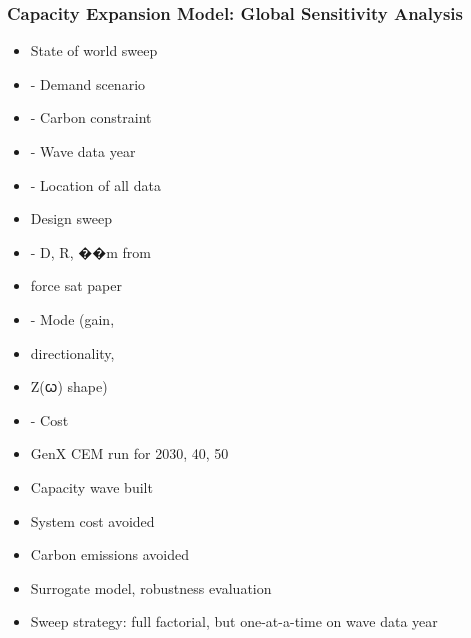 \begin{frame}
	\frametitle{Capacity Expansion Model: Global Sensitivity Analysis}
	\begin{itemize}
		\item State of world sweep
		\item - Demand scenario
		\item - Carbon constraint
		\item - Wave data year
		\item - Location of all data
		      
		\item Design sweep
		\item - D, R, ��m from
		\item force sat paper
		\item - Mode (gain,
		\item directionality,
		\item Z(ꞷ) shape)
		\item - Cost
		      
		\item GenX CEM run for 2030, 40, 50
		      
		\item Capacity wave built
		\item System cost avoided
		\item Carbon emissions avoided
		      
		\item Surrogate model, robustness evaluation
		      
		\item Sweep strategy: full factorial, but one-at-a-time on wave data year
	\end{itemize}
	
\end{frame}


